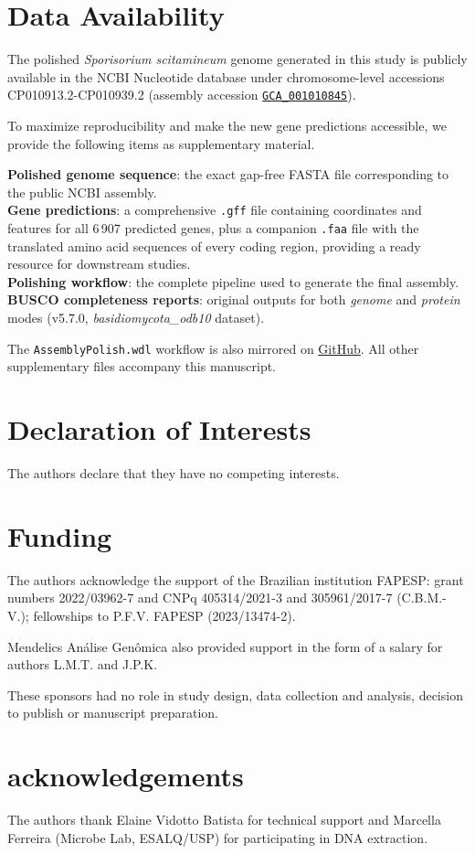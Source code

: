 \documentclass[Journal,letterpaper]{ascelike-new}
\begin{document}
\section*{Data Availability}

The polished \textit{Sporisorium scitamineum} genome generated in
this study is publicly available in the NCBI Nucleotide database
under chromosome-level accessions CP010913.2-CP010939.2 (assembly
accession
\href{https://www.ncbi.nlm.nih.gov/datasets/genome/GCA_001010845}{\texttt{GCA\_001010845}}).

To maximize reproducibility and make the new gene predictions
accessible, we provide the following items as supplementary material.

\noindent\textbf{Polished genome sequence}: the exact gap-free FASTA
file corresponding to the public NCBI assembly.\\
\textbf{Gene predictions}: a comprehensive \texttt{.gff} file
containing coordinates and features for all 6\,907 predicted genes,
plus a companion \texttt{.faa} file with the translated amino acid
sequences of every coding region, providing a ready resource for
downstream studies.\\
\textbf{Polishing workflow}: the complete pipeline used to generate
the final assembly.\\
\textbf{BUSCO completeness reports}: original outputs for both
\textit{genome} and \textit{protein} modes (v5.7.0,
\textit{basidiomycota\_odb10} dataset).

The \texttt{AssemblyPolish.wdl} workflow is also mirrored on
\href{https://github.com/lmtani/s-scitamineum-pipelines}{GitHub}. All
other supplementary files accompany this manuscript.

\section*{Declaration of Interests}

The authors declare that they have no competing interests.

\section*{Funding}

The authors acknowledge the support of the Brazilian institution
FAPESP: grant numbers 2022/03962-7 and CNPq 405314/2021-3 and
305961/2017-7 (C.B.M.-V.); fellowships to P.F.V. FAPESP (2023/13474-2).

Mendelics Análise Genômica also provided support in the form of a
salary for authors L.M.T. and J.P.K.

These sponsors had no role in study design, data collection and
analysis, decision to publish or manuscript preparation.

\section*{acknowledgements}

The authors thank Elaine Vidotto Batista for technical support and
Marcella Ferreira (Microbe Lab, ESALQ/USP) for participating in DNA extraction.


\end{document}
